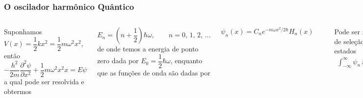 \documentclass[12pt,brazil,table]{beamer}
\begin{document}
\begin{frame}
  \frametitle{O oscilador harmônico Quântico}
  
  
  \fontsize{9pt}{11pt}\selectfont
  \begin{columns}
    
    
      Suponhamos $V(x) = \dfrac{1}{2}kx^2=\dfrac{1}{2}m\omega^2x^2$, então
      \[
       -\dfrac{h^2}{2m}\dfrac{\partial^2\psi}{\partial x^2}+\dfrac{1}{2}m\omega^2x^2 x=E\psi
      \]
      a qual pode ser resolvida e obtermos
      
      \[
       E_n = \left( n + \dfrac{1}{2} \right)\hbar \omega,\qquad n=0,\, 1,\, 2, \, \ldots
      \]
      de onde temos a energia de ponto zero dada por $E_0=\dfrac{1}{2} \hbar \omega$, enquanto que as funções de onda são dadas por
      
      \[
       \psi_n (x) = C_n e^{-m\omega x^2/2\hbar}H_n (x)
      \]
    
    {\centering \includegraphics[height=4.cm]{figuras/fig27}}

    Pode ser mostrada a seguinte regra de seleção para as transições entre estados
    \begin{align*}
     \int_{-\infty}^{\infty} \psi_n\, x \, \psi_m\, dx=0\quad & \text{a menos que}\\
     &  n=m\pm 1
    \end{align*}

    
    ou $\Delta n = \pm 1$

      
  \end{columns}
\end{frame}


  
\end{document}
